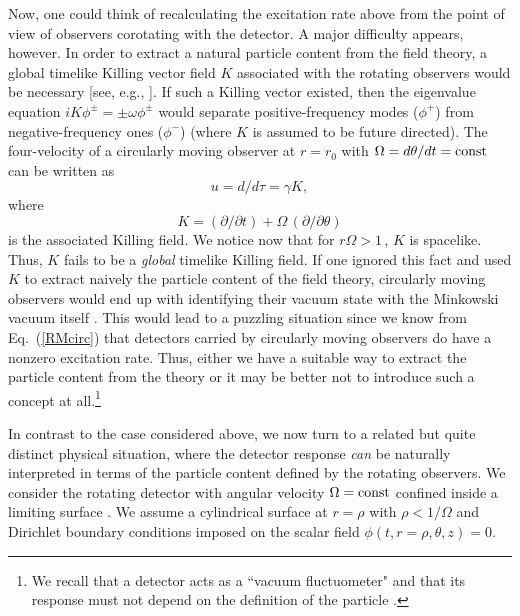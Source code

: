 \documentclass[12pt,nofootinbib,floatfix,aps,prd,showpacs,amsmath,amssymb,eqsecnum]{revtex4-2}
\begin{document}
Now, one could think of recalculating the excitation rate above
from the point of view of observers corotating with the detector.
A major difficulty appears, however.
In order to extract a natural particle content from the field 
theory, a global timelike Killing vector field $K$ 
associated with the rotating observers would be necessary 
[see, e.g., \textcite{WaldQFTCS}]. If such a Killing vector existed, then
the eigenvalue equation $
i K \phi^{\pm} = \pm \omega \phi^{\pm}
$
would separate positive-frequency modes ($\phi^+$) from
negative-frequency ones ($\phi^-$) 
(where $K$ is assumed to be future directed). 
The four-velocity of a circularly moving observer 
at $r=r_0$ with $\Omega = d\theta/dt =  {\rm const}$  can be written
as 
$$
u = d/d\tau = \gamma K,
$$
where
\begin{equation}
    K = ({\partial}/{\partial t}) + 
    \Omega \, ({\partial}/{\partial \theta})
\label{rot vector}
\end{equation}
is the associated Killing field. 
We notice now that for $r\Omega> 1\,$, $K$ is spacelike.
Thus, $K$ fails to be a {\em global} timelike Killing field.
If one ignored this fact and used $K$ to extract naively 
the particle content of the field theory, circularly moving 
observers would end up with identifying their vacuum state 
with the Minkowski vacuum itself \cite{Letawetal80}. 
This would lead to a puzzling situation since we know from
Eq.~(\ref{RMcirc}) that detectors carried by circularly moving 
observers do have a nonzero excitation rate.
Thus, either we have a suitable way to extract
the particle content from the theory \cite{Ashtekaretal75,Kay78} or 
it may be better not to introduce such a concept at 
all.\footnote{We recall that a detector acts as a ``vacuum fluctuometer" 
and that its response must not depend on the definition of the
particle \cite{Groveetal83}.}

In contrast to the case considered above, we now turn to a 
related but quite distinct physical situation, where the detector 
response {\em can} be naturally interpreted in terms of the 
particle content defined by the rotating observers. We consider the 
rotating detector with angular velocity $\Omega = {\rm const}$ 
confined inside a limiting surface \cite{Levinetal93, Daviesetal96}.
We assume a cylindrical surface at $r=\rho$ with $\rho < 1/\Omega $
and Dirichlet boundary conditions imposed on the scalar field 
$
\phi (t, r=\rho, \theta, z)= 0.
$
\end{document}
